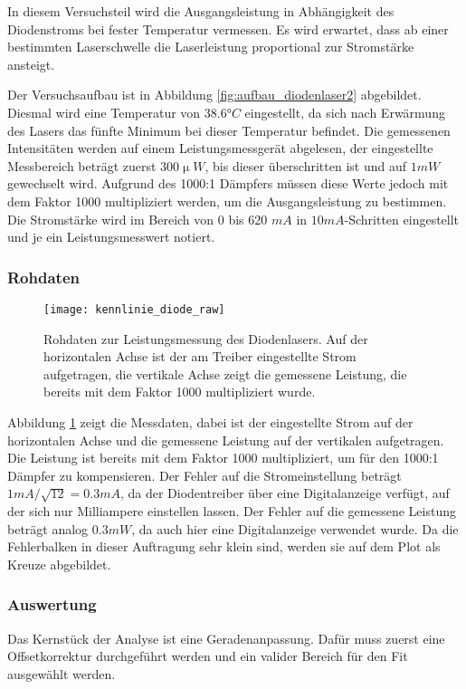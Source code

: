 \documentclass{../Misc/MontavonLaTeX/Montavon}
\newcommand{\halfwidth}{0.48\textwidth}
\begin{document}
In diesem Versuchsteil wird die Ausgangsleistung in Abhängigkeit des Diodenstroms bei fester Temperatur vermessen. Es wird erwartet, dass ab einer bestimmten Laserschwelle die Laserleistung proportional zur Stromstärke ansteigt.

Der Versuchsaufbau ist in Abbildung \ref{fig:aufbau_diodenlaser2} abgebildet. Diesmal wird eine Temperatur von $38.6 \unit{\degree C}$ eingestellt, da sich nach Erwärmung des Lasers das fünfte Minimum bei dieser Temperatur befindet. Die gemessenen Intensitäten werden auf einem Leistungsmessgerät abgelesen, der eingestellte Messbereich beträgt zuerst $300 \unit{\upmu W}$, bis dieser überschritten ist und auf $1 \unit{mW}$ gewechselt wird. Aufgrund des 1000:1 Dämpfers müssen diese Werte jedoch mit dem Faktor 1000 multipliziert werden, um die Ausgangsleistung zu bestimmen. Die Stromstärke wird im Bereich von 0 bis 620 $\unit{mA}$ in $10 \unit{mA}$-Schritten eingestellt und je ein Leistungsmesswert notiert.

\subsubsection{Rohdaten}
\begin{figure}[htbp]
\centering
\texttt{[image: kennlinie\_diode\_raw]}
\caption{Rohdaten zur Leistungsmessung des Diodenlasers. Auf der horizontalen Achse ist der am Treiber eingestellte Strom aufgetragen, die vertikale Achse zeigt die gemessene Leistung, die bereits mit dem Faktor 1000 multipliziert wurde.}
\label{fig:kennlinie_diode_raw}
\end{figure}

Abbildung \ref{fig:kennlinie_diode_raw} zeigt die Messdaten, dabei ist der eingestellte Strom auf der horizontalen Achse und die gemessene Leistung auf der vertikalen aufgetragen. Die Leistung ist bereits mit dem Faktor 1000 multipliziert, um für den 1000:1 Dämpfer zu kompensieren. Der Fehler auf die Stromeinstellung beträgt $1 \unit{mA} / \sqrt{12} = 0.3 \unit{mA}$, da der Diodentreiber über eine Digitalanzeige verfügt, auf der sich nur Milliampere einstellen lassen. Der Fehler auf die gemessene Leistung beträgt analog $0.3 \unit{mW}$, da auch hier eine Digitalanzeige verwendet wurde. Da die Fehlerbalken in dieser Auftragung sehr klein sind, werden sie auf dem Plot als Kreuze abgebildet.

\subsubsection{Auswertung}
Das Kernstück der Analyse ist eine Geradenanpassung. Dafür muss zuerst eine Offsetkorrektur durchgeführt werden und ein valider Bereich für den Fit ausgewählt werden. 
\end{document}
